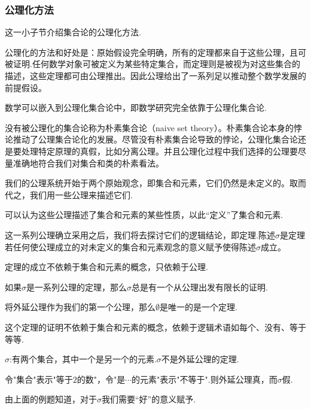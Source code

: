 \subsubsection{公理化方法}

这一小子节介绍集合论的公理化方法.

公理化的方法和好处是：原始假设完全明确，所有的定理都来自于这些公理，且可被证明.任何数学对象可被定义为某些特定集合，而定理则是被视为对这些集合的描述，这些定理都可由公理推出。因此公理给出了一系列足以推动整个数学发展的前提假设。

\begin{note}
    数学可以嵌入到公理化集合论中，即数学研究完全依靠于公理化集合论.
\end{note}

没有被公理化的集合论称为朴素集合论（naive set theory）。朴素集合论本身的悖论推动了公理集合论化的发展。尽管没有朴素集合论导致的悖论，公理化集合论还是要处理特定原理的真假，比如分离公理。并且公理化过程中我们选择的公理要尽量准确地符合我们对集合和类的朴素看法。

我们的公理系统开始于两个原始观念，即集合和元素，它们仍然是未定义的。取而代之，我们用一些公理来描述它们.

\begin{note}
    可以认为这些公理描述了集合和元素的某些性质，以此“定义”了集合和元素.
\end{note}

这一系列公理确立采用之后，我们将去探讨它们的逻辑结论，即定理.陈述$\sigma$是定理若任何使公理成立的对未定义的集合和元素观念的意义赋予使得陈述$\sigma$成立。

\begin{note}
    定理的成立不依赖于集合和元素的概念，只依赖于公理.
\end{note}

如果$\sigma$是一系列公理的定理，那么$\sigma$总是有一个从公理出发有限长的证明.

\begin{example}
    将外延公理作为我们的第一个公理，那么$\emptyset$是唯一的是一个定理.
\end{example}
\begin{note}
    这个定理的证明不依赖于集合和元素的概念，依赖于逻辑术语如每个、没有、等于等等.
\end{note}

\begin{example}
    $\sigma$:有两个集合，其中一个是另一个的元素.$\sigma$不是外延公理的定理.

    令"集合"表示"等于$2$的数"，令"是$\cdots$的元素"表示"不等于".则外延公理真，而$\sigma$假.
\end{example}

\begin{note}
    由上面的例题知道，对于$\sigma$我们需要“好”的意义赋予.
\end{note}





